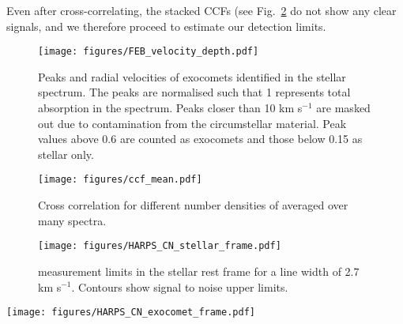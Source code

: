 \documentclass{aa}
\newcommand{\kms}{km s$^{-1}$}
\begin{document}
Even after cross-correlating, the stacked CCFs (see Fig.~\ref{fig:ccf_mean} do not show any clear signals, and we therefore proceed to estimate our detection limits.

\begin{figure}
    \begin{centering}
        \texttt{[image: figures/FEB\_velocity\_depth.pdf]}
        \caption{Peaks and radial velocities of exocomets identified in the stellar spectrum.
        The peaks are normalised such that 1 represents total absorption in the spectrum.
        Peaks closer than 10 \kms{} are masked out due to contamination from the circumstellar material.
        Peak values above 0.6 are counted as exocomets and those below 0.15 as stellar only.}
        \label{fig:FEB_velocity}
    \end{centering}
\end{figure}

\begin{figure}
    \begin{centering}
        \texttt{[image: figures/ccf\_mean.pdf]}
        \caption{Cross correlation for different number densities of  averaged over many spectra.}
        \label{fig:ccf_mean}
    \end{centering}
\end{figure}

\begin{figure}
    \begin{centering}
        \texttt{[image: figures/HARPS\_CN\_stellar\_frame.pdf]}
        \caption{ measurement limits in the stellar rest frame for a  line width of 2.7 \kms{}. Contours show signal to noise upper limits.}
        \label{fig:CN_stellar_frame}
    \end{centering}
\end{figure}

\begin{figure*}
    \begin{centering}
        \texttt{[image: figures/HARPS\_CN\_exocomet\_frame.pdf]}
        \caption{ measurement limits in the exocomet frame for a  line width of 2.7, 10 and 20 \kms{}. Contours show signal to noise upper limits.}
        \label{fig:CN_exocomet_frame}
    \end{centering}
\end{figure*}
\end{document}
